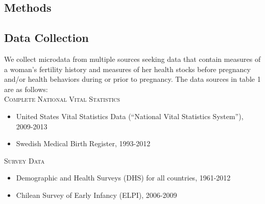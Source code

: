 \documentclass{nature}
\begin{document}
\begin{linenumbers}
\clearpage

\section{Methods}
\subsection{Data Collection}
We collect microdata from multiple sources seeking data that %
contain measures of a woman's fertility history 
and measures of her health stocks before pregnancy and/or health behaviors during or prior to pregnancy.  %
The data sources in table 1 are as follows: \vspace{3mm} \\
\textsc{Complete National Vital Statistics} \vspace{-10mm}
\begin{itemize}
\item United States Vital Statistics Data (``National Vital Statistics System''), 2009-2013 \vspace{-4mm}
\item Swedish Medical Birth Register, 1993-2012 \vspace{-8mm}
\end{itemize}
\textsc{Survey Data} \vspace{-10mm}
\begin{itemize}
\item Demographic and Health Surveys (DHS) for all countries, 1961-2012 \vspace{-4mm}
\item Chilean Survey of Early Infancy (ELPI), 2006-2009 \vspace{-4mm}

\end{itemize}
\end{linenumbers}
\end{document}
